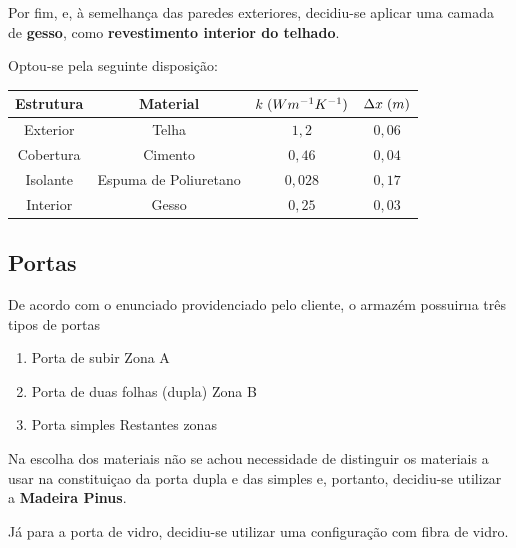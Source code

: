 \documentclass[12pt, a4paper]{article}
\begin{document}
Por fim, e, à semelhança das paredes exteriores, decidiu-se aplicar uma camada de \textbf{gesso}, como
\textbf{revestimento interior do telhado}.

Optou-se pela seguinte disposição:

\begin{center}
	\begin{tabular}{||c c c c||}
		\hline
		Estrutura & Material              & $k \hspace{1mm} (Wm^{-1}K^{-1})$ & $\Delta x \hspace{1mm} (m)$ \\ [0.5ex]
		\hline\hline
		Exterior  & Telha                 & $1,2$                            & $0,06$                      \\
		\hline
		Cobertura & Cimento               & $0,46$                           & $0,04$                      \\
		\hline
		Isolante  & Espuma de Poliuretano & $0,028$                          & $0,17$                      \\
		\hline
		Interior  & Gesso                 & $0,25$                           & $0,03$                      \\
		\hline
	\end{tabular}
\end{center}



\subsection{Portas}\label{sub:Portas}

De acordo com o enunciado providenciado pelo cliente, o armaz\'em possuir\i{\i}a
tr\^es tipos de portas

\begin{enumerate}
    \item Porta de subir {\textemdash} Zona A
    \item Porta de duas folhas (dupla) {\textemdash} Zona B
    \item Porta simples {\textemdash} Restantes zonas
\end{enumerate}

Na escolha dos materiais n\~ao se achou necessidade de distinguir os materiais a
usar na constitui\c{c}ao da porta dupla e das simples e, portanto, decidiu-se
utilizar a \textbf{Madeira Pinus}.

J\'a para a porta de vidro, decidiu-se utilizar uma configura\c{c}\~ao com fibra de vidro.
\end{document}

